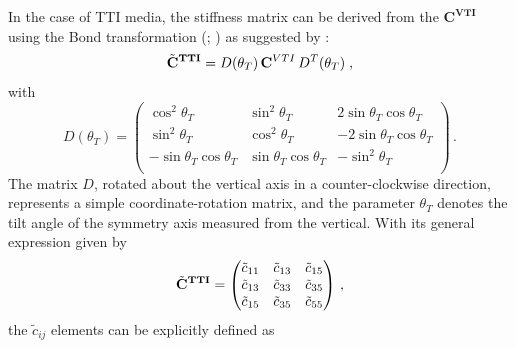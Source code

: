 In the case of TTI media, the stiffness matrix can be derived from the $\mathbf{C}^\mathbf{VTI}$ using the Bond transformation (\cite{Bond:43}; \cite{Carcione:07}) as suggested by \citet{Oh:20}: 
\begin{equation}
    \Tilde{\mathbf{C}}^\mathbf{TTI} = D(\theta_T)\,\mathbf{C}^{VTI}\,D^T(\theta_T)\;,
\end{equation}
with 
\begin{equation}
    D(\theta_T) = 
    \begin{pmatrix}
    \cos^{2}\theta_T & \sin^{2}\theta_T & 2\sin\theta_T\cos\theta_T \\
    \sin^{2}\theta_T & \cos^{2}\theta_T & -2\sin\theta_T\cos\theta_T \\
    -\sin\theta_T\cos\theta_T & \sin\theta_T\cos\theta_T & -\sin^{2}\theta_T \\
    \end{pmatrix}\,.
    \label{eq:d_vti}
\end{equation}
The matrix $\textit{D}$, rotated about the vertical axis in a counter-clockwise direction, represents a simple coordinate-rotation matrix, and the parameter $\theta_T$ denotes the tilt angle of the symmetry axis measured from the vertical. With its general expression given by
\begin{equation}
    \Tilde{\mathbf{C}}^\mathbf{TTI} = 
    \begin{pmatrix}
    \Tilde{c}_{11} & \Tilde{c}_{13} & \Tilde{c}_{15} \\
    \Tilde{c}_{13} & \Tilde{c}_{33} & \Tilde{c}_{35} \\
    \Tilde{c}_{15} & \Tilde{c}_{35} & \Tilde{c}_{55} \\
    \end{pmatrix}\,,
    \label{eq:c_tti_3x3}
\end{equation}
the $\tilde{c}_{ij}$ elements can be explicitly defined as
